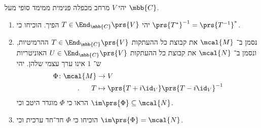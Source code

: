 \documentclass[a4paper,10pt,twoside,openany]{book}
\begin{document}
\begin{exercisechap}
יהי
$V$
מרחב מכפלה פנימית ממימד סופי מעל
$\mbb{C}$.

\begin{enumerate}
\item
יהי
$T \in \End_{\mbb{C}}\prs{V}$
הפיך. הוכיחו כי
$\prs{T^*}^{-1} = \prs{T^{-1}}^*$.

\item
נסמן ב־%
$\mcal{M}$
את קבוצת כל ההעתקות
$T \in \End_{\mbb{C}}\prs{V}$
ההרמיטיות, ונסמן ב־%
$\mcal{N}$
את קבוצת כל ההעתקות
$U \in \End_{\mbb{C}}\prs{V}$
האוניטריות ש־%
$1$
אינו ערך עצמי שלהן.
יהי
\begin{align*}
\Phi \colon \mcal{M} &\to V \\
\text{.} \hphantom{lala} T &\mapsto \prs{T + i \id_V} \prs{T - i \id_V}^{-1}
\end{align*}
הראו כי
$\Phi$
מוגדר היטב וכי
$\im\prs{\Phi} \subseteq \mcal{N}$.

\item
הוכיחו כי
$\Phi$
חד־חד ערכית וכי
$\im\prs{\Phi} = \mcal{N}$.
\end{enumerate}
\end{exercisechap}
\end{document}
